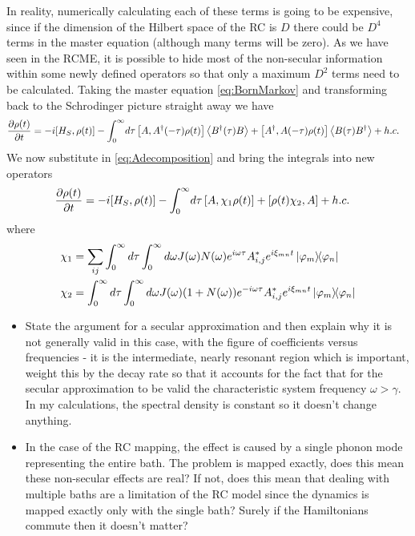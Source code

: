 \documentclass[]{article}
\begin{document}
In reality, numerically calculating each of these terms is going to be expensive, since if the dimension of the Hilbert space of the RC is $D$ there could be $D^4$ terms in the master equation (although many terms will be zero). As we have seen in the RCME, it is possible to hide most of the non-secular information within some newly defined operators so that only a maximum $D^2$ terms need to be calculated. Taking the master equation \ref{eq:BornMarkov} and transforming back to the Schrodinger picture straight away we have
\begin{align}
	\begin{split}
		\label{eq:BornMarkovSchrod}
		\pdv{\rho(t)}{t} = -i[H_S, \rho(t)] - \int_{0}^{\infty}& d\tau  \left[A, A^{\dagger}(-\tau)\rho(t)\right] \expval{B^{\dagger}(\tau)B} + \left[A^{\dagger},A(-\tau)\rho(t)\right] \expval{B(\tau)B^{\dagger}} + h.c.
	\end{split}
\end{align}
We now substitute in \ref{eq:Adecomposition} and bring the integrals into new operators
\begin{align}
	\begin{split}
		\pdv{\rho(t)}{t} = -i[H_S, \rho(t)] - \int_{0}^{\infty}& d\tau  \left[A, \chi_1 \rho(t)\right]  + \left[\rho(t)\chi_2,A\right] + h.c.
	\end{split}
\end{align}
where 
\begin{align}
	\begin{split}
\chi_1 &= \sum_{i j}\int_{0}^{\infty}d\tau\int_{0}^{\infty}d\omega J(\omega)N(\omega)e^{i\omega\tau}A_{i,j}^* e^{i\xi_{mn}t}\dyad{\varphi_m}{\varphi_n} \\
\chi_2 &= \int_{0}^{\infty}d\tau\int_{0}^{\infty}d\omega J(\omega)(1+N(\omega))e^{-i\omega\tau}A_{i,j}^* e^{i\xi_{mn}t}\dyad{\varphi_m}{\varphi_n} 
	\end{split}
\end{align}

\begin{itemize}
	\item State the argument for a secular approximation and then explain why it is not generally valid in this case, with the figure of coefficients versus frequencies - it is the intermediate, nearly resonant region which is important, weight this by the decay rate so that it accounts for the fact that for the secular approximation to be valid the characteristic system frequency $\omega>\gamma$. In my calculations, the spectral density is constant so it doesn't change anything.
	\item In the case of the RC mapping, the effect is caused by a single phonon mode representing the entire bath. The problem is mapped exactly, does this mean these non-secular effects are real? If not, does this mean that dealing with multiple baths are a limitation of the RC model since the dynamics is mapped exactly only with the single bath? Surely if the Hamiltonians commute then it doesn't matter?
	
	
\end{itemize}
\end{document}

